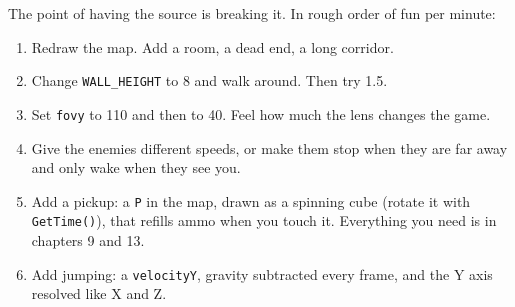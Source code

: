 The point of having the source is breaking it. In rough order of fun per minute:

\begin{enumerate}[leftmargin=*,itemsep=2pt]
  \item Redraw the map. Add a room, a dead end, a long corridor.
  \item Change \lstinline|WALL_HEIGHT| to 8 and walk around. Then try 1.5.
  \item Set \lstinline|fovy| to 110 and then to 40. Feel how much the lens
        changes the game.
  \item Give the enemies different speeds, or make them stop when they are far
        away and only wake when they see you.
  \item Add a pickup: a \lstinline|P| in the map, drawn as a spinning cube
        (rotate it with \lstinline|GetTime()|), that refills ammo when you touch
        it. Everything you need is in chapters 9 and 13.
  \item Add jumping: a \lstinline|velocityY|, gravity subtracted every frame, and
        the Y axis resolved like X and Z.
\end{enumerate}
